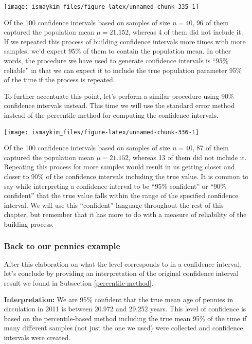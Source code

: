 \documentclass[12pt,]{krantz}
\theoremstyle{definition}
\theoremstyle{definition}
\theoremstyle{definition}
\theoremstyle{remark}
\begin{document}
\begin{center}\texttt{[image: ismaykim\_files/figure-latex/unnamed-chunk-335-1]} \end{center}

Of the 100 confidence intervals based on samples of size \(n = 40\), 96
of them captured the population mean \(\mu = 21.152\), whereas 4 of them
did not include it. If we repeated this process of building confidence
intervals more times with more samples, we'd expect 95\% of them to
contain the population mean. In other words, the procedure we have used
to generate confidence intervals is ``95\% reliable'' in that we can
expect it to include the true population parameter 95\% of the time if
the process is repeated.

To further accentuate this point, let's perform a similar procedure
using 90\% confidence intervals instead. This time we will use the
standard error method instead of the percentile method for computing the
confidence intervals.

\begin{center}\texttt{[image: ismaykim\_files/figure-latex/unnamed-chunk-336-1]} \end{center}

Of the 100 confidence intervals based on samples of size \(n = 40\), 87
of them captured the population mean \(\mu = 21.152\), whereas 13 of
them did not include it. Repeating this process for more samples would
result in us getting closer and closer to 90\% of the confidence
intervals including the true value. It is common to say while
interpreting a confidence interval to be ``95\% confident'' or ``90\%
confident'' that the true value falls within the range of the specified
confidence interval. We will use this ``confident'' language throughout
the rest of this chapter, but remember that it has more to do with a
measure of reliability of the building process.

\subsubsection*{Back to our pennies
example}\label{back-to-our-pennies-example}


After this elaboration on what the level corresponds to in a confidence
interval, let's conclude by providing an interpretation of the original
confidence interval result we found in Subsection
\ref{percentile-method}.

\textbf{Interpretation:} We are 95\% confident that the true mean age of
pennies in circulation in 2011 is between 20.972 and 29.252 years. This
level of confidence is based on the percentile-based method including
the true mean 95\% of the time if many different samples (not just the
one we used) were collected and confidence intervals were created.
\end{document}
